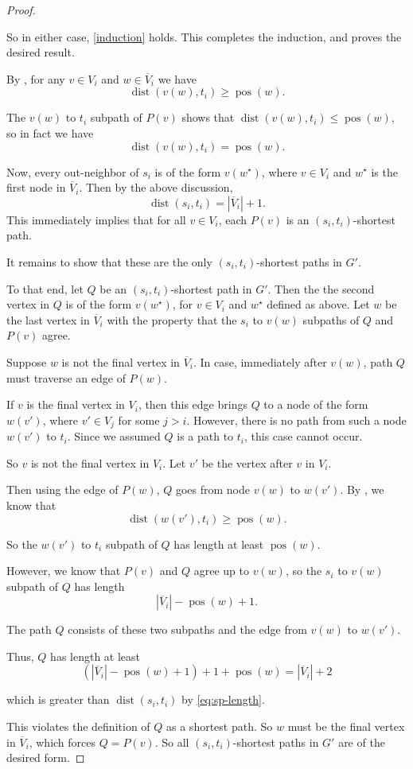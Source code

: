 \documentclass[11pt]{article}
\newcommand{\grp}[1]{\left(#1\right)}
\DeclareMathOperator{\dist}{dist}
\renewcommand{\bar}{\overline}
\DeclareMathOperator{\pos}{pos}
\theoremstyle{definition}
\begin{document}
\begin{proof}
\begin{claimproof}
So in either case, \cref{induction} holds.
This completes the induction, and proves the desired result.
\end{claimproof}

By , for any $v\in V_i$ and $w\in\bar{V}_i$ we have 
    \[\dist(v(w),t_i)\ge \pos(w).\]

The $v(w)$ to $t_i$ subpath of $P(v)$ shows that $\dist(v(w),t_i)\le \pos(w)$, so in fact we have 
    \[\dist(v(w),t_i)= \pos(w).\]

Now, every out-neighbor of $s_i$ is of the form $v(w^\star)$, where $v\in V_i$ and $w^\star$ is the first node in $\bar{V}_i$.
Then by the above discussion,
    \begin{equation}
    \label{eq:sp-length}
    \dist(s_i,t_i) = |\bar{V}_i| + 1.
    \end{equation}
This immediately implies that for all $v\in V_i$, each $P(v)$ is an $(s_i,t_i)$-shortest path.

It remains to show that these are the only $(s_i,t_i)$-shortest paths in $G'$.

To that end, let $Q$ be an $(s_i,t_i)$-shortest path in $G'$.
Then the the second vertex in $Q$ is of the form $v(w^\star)$, for $v\in V_i$ and $w^\star$ defined as above.
Let $w$ be the last vertex in $\bar{V}_i$ with the property that the $s_i$ to $v(w)$ subpaths of $Q$ and $P(v)$ agree.

Suppose $w$ is not the final vertex in $\bar{V}_i$.
In case, immediately after $v(w)$, path $Q$ must traverse an edge of $P(w)$.

If $v$ is the final vertex in $V_i$, then this edge brings $Q$ to a node of the form $w(v')$, where $v'\in V_j$ for some $j > i$.
However, there is no path from such a node $w(v')$ to $t_i$.
Since we assumed $Q$ is a path to $t_i$, this case cannot occur.

So $v$ is not the final vertex in $V_i$.
Let $v'$ be the vertex after $v$ in $V_i$.

Then using the edge of $P(w)$, $Q$ goes from node $v(w)$ to $w(v')$.
By , we know that 
    \[\dist(w(v'),t_i)\ge \pos(w).\]

So the $w(v')$ to $t_i$ subpath of $Q$ has length at least $\pos(w)$.

However, we know that $P(v)$ and $Q$ agree up to $v(w)$, so the $s_i$ to $v(w)$ subpath of $Q$ has length 
    \[|\bar{V}_i| - \pos(w) + 1.\]
    
The path $Q$ consists of these two subpaths and the edge from $v(w)$ to $w(v')$.

Thus, $Q$ has length at least 
\[\grp{|\bar{V}_i| - \pos(w) + 1} + 1 + \pos(w) = |\bar{V}_i| + 2\]

which is greater than $\dist(s_i,t_i)$ by \cref{eq:sp-length}.

This violates the definition of $Q$ as a shortest path.
So $w$ must be the final vertex in $\bar{V}_i$, which forces $Q = P(v)$.
So all $(s_i,t_i)$-shortest paths in $G'$ are of the desired form.
\end{proof}
\end{document}
